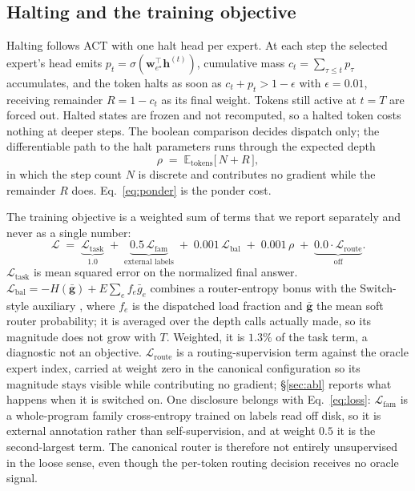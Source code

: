 \documentclass{article}
\begin{document}
\subsection{Halting and the training objective}

Halting follows ACT \citep{graves2016act} with one halt head per expert. At
each step the selected expert's head emits
$p_t = \sigma(\mathbf{w}_{e^\star}^{\!\top}\mathbf{h}^{(t)})$, cumulative mass
$c_t = \sum_{\tau \le t} p_\tau$ accumulates, and the token halts as soon as
$c_t + p_t > 1 - \epsilon$ with $\epsilon = 0.01$, receiving remainder
$R = 1 - c_t$ as its final weight. Tokens still active at $t = T$ are forced
out. Halted states are frozen and not recomputed, so a halted token costs
nothing at deeper steps. The boolean comparison decides dispatch only; the
differentiable path to the halt parameters runs through the expected depth
\begin{equation}
\rho \;=\; \mathbb{E}_{\text{tokens}}\big[\,N + R\,\big],
\label{eq:ponder}
\end{equation}
in which the step count $N$ is discrete and contributes no gradient while the
remainder $R$ does. Eq.~\ref{eq:ponder} is the ponder cost.

The training objective is a weighted sum of terms that we report separately
and never as a single number:
\begin{equation}
\mathcal{L} \;=\;
\underbrace{\mathcal{L}_{\text{task}}}_{1.0} \;+\;
\underbrace{0.5\,\mathcal{L}_{\text{fam}}}_{\text{external labels}} \;+\;
0.001\,\mathcal{L}_{\text{bal}} \;+\;
0.001\,\rho \;+\;
\underbrace{0.0 \cdot \mathcal{L}_{\text{route}}}_{\text{off}} .
\label{eq:loss}
\end{equation}
$\mathcal{L}_{\text{task}}$ is mean squared error on the normalized final
answer. $\mathcal{L}_{\text{bal}} = -H(\bar{\mathbf{g}}) + E\sum_e f_e
\bar{g}_e$ combines a router-entropy bonus with the Switch-style auxiliary
\citep{fedus2022switch}, where $f_e$ is the dispatched load fraction and
$\bar{\mathbf{g}}$ the mean soft router probability; it is averaged over the
depth calls actually made, so its magnitude does not grow with $T$. Weighted, it
is $1.3\%$ of the task term, a diagnostic not an objective.
$\mathcal{L}_{\text{route}}$ is a routing-supervision term against the oracle
expert index, carried at weight zero in the canonical configuration so its
magnitude stays visible while contributing no gradient; \S\ref{sec:abl} reports
what happens when it is switched on. One disclosure belongs with
Eq.~\ref{eq:loss}: $\mathcal{L}_{\text{fam}}$ is a whole-program family
cross-entropy trained on labels read off disk, so it is external annotation
rather than self-supervision, and at weight $0.5$ it is the second-largest term.
The canonical router is therefore not entirely unsupervised in the loose sense,
even though the per-token routing decision receives no oracle signal.
\end{document}
